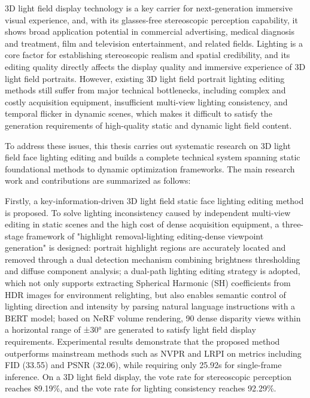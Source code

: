 \begin{enabstract}

    3D light field display technology is a key carrier for next-generation immersive visual experience, and, with its glasses-free stereoscopic perception capability, it shows broad application potential in commercial advertising, medical diagnosis and treatment, film and television entertainment, and related fields. Lighting is a core factor for establishing stereoscopic realism and spatial credibility, and its editing quality directly affects the display quality and immersive experience of 3D light field portraits. However, existing 3D light field portrait lighting editing methods still suffer from major technical bottlenecks, including complex and costly acquisition equipment, insufficient multi-view lighting consistency, and temporal flicker in dynamic scenes, which makes it difficult to satisfy the generation requirements of high-quality static and dynamic light field content.
    
To address these issues, this thesis carries out systematic research on 3D light field face lighting editing and builds a complete technical system spanning static foundational methods to dynamic optimization frameworks. The main research work and contributions are summarized as follows:

Firstly, a key-information-driven 3D light field static face lighting editing method is proposed. To solve lighting inconsistency caused by independent multi-view editing in static scenes and the high cost of dense acquisition equipment, a three-stage framework of "highlight removal-lighting editing-dense viewpoint generation" is designed: portrait highlight regions are accurately located and removed through a dual detection mechanism combining brightness thresholding and diffuse component analysis; a dual-path lighting editing strategy is adopted, which not only supports extracting Spherical Harmonic (SH) coefficients from HDR images for environment relighting, but also enables semantic control of lighting direction and intensity by parsing natural language instructions with a BERT model; based on NeRF volume rendering, 90 dense disparity views within a horizontal range of ±30° are generated to satisfy light field display requirements. Experimental results demonstrate that the proposed method outperforms mainstream methods such as NVPR and LRPI on metrics including FID (33.55) and PSNR (32.06), while requiring only 25.92s for single-frame inference. On a 3D light field display, the vote rate for stereoscopic perception reaches 89.19\%, and the vote rate for lighting consistency reaches 92.29\%.


\end{enabstract}

